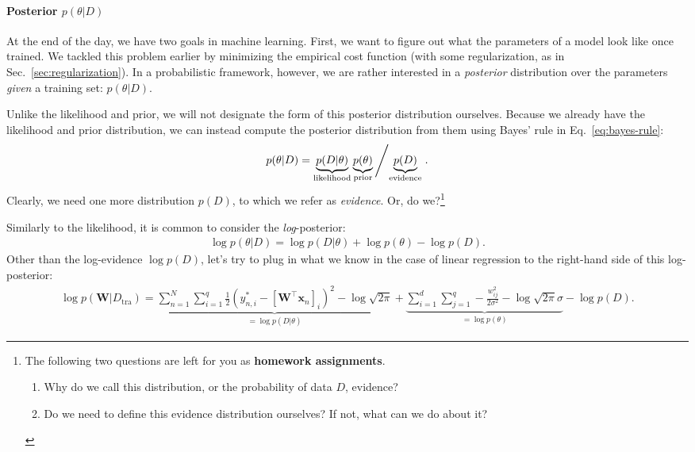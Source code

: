 \documentclass{report}
\newcommand{\vect}[1]{\mathbf{#1}}
\newcommand{\matr}[1]{\mathbf{#1}}
\newcommand{\vx}[0]{\vect{x}}
\newcommand{\mW}[0]{\matr{W}}
\newcommand{\tra}{\text{tra}}
\begin{document}
\paragraph{Posterior $p(\theta | D)$}

At the end of the day, we have two goals in machine learning. First, we want to
figure out what the parameters of a model look like once trained. We tackled
this problem earlier by minimizing the empirical cost function (with some
regularization, as in Sec.~\ref{sec:regularization}). In a probabilistic
framework, however, we are rather interested in a {\it posterior} distribution
over the parameters {\it given} a training set: $p(\theta | D)$. 

Unlike the likelihood and prior, we will not designate the form of this
posterior distribution ourselves. Because we already have the likelihood and
prior distribution, we can instead compute the posterior distribution from them
using Bayes' rule in Eq.~\eqref{eq:bayes-rule}:
\begin{align*}
    p(\theta | D) = \underbrace{p(D|\theta)}_{\text{likelihood}}
    \underbrace{p(\theta)}_{\text{prior}}
    \left/
    \underbrace{p(D)}_{\text{evidence}}
    \right..
\end{align*}
Clearly, we need one more distribution $p(D)$, to which we refer as {\it
evidence}. Or, do we?\footnote{
    The following two questions are left for you as {\bf homework assignments}.
    \begin{enumerate}
        \item Why do we call this distribution, or the probability of data $D$,
            evidence? 
        \item Do we need to define this evidence distribution ourselves? If not,
            what can we do about it?
    \end{enumerate}
}

Similarly to the likelihood, it is common to consider the {\it log}-posterior:
\begin{align*}
    \log p(\theta | D) = \log p (D|\theta) + \log p(\theta) - \log p(D).
\end{align*}
Other than the log-evidence $\log p(D)$, let's try to plug in what we know in
the case of linear regression to the right-hand side of this log-posterior:
\begin{align*}
    \log p(\mW | D_{\tra}) = 
    \underbrace{
        \sum_{n=1}^N \sum_{i=1}^q 
        \frac{1}{2} (y^*_{n,i} - [\mW^\top \vx_n]_i )^2 
        - \log \sqrt{2\pi}
    }_{=\log p (D|\theta)}
    +
    \underbrace{
        \sum_{i=1}^{d} 
        \sum_{j=1}^{q}
        -\frac{ w_{ij}^2}{2\sigma^2} - \log \sqrt{2\pi}\sigma
    }_{=\log p(\theta)}
    - 
    \log p(D).
\end{align*}
\end{document}
